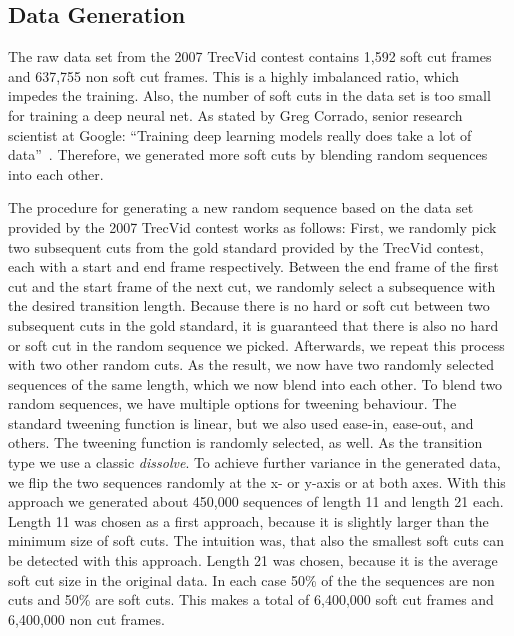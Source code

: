 \subsection{Data Generation}
\label{sec:soft_cut_data_generation}

The raw data set from the 2007 TrecVid contest contains 1,592 soft cut frames and 637,755 non soft cut frames.
This is a highly imbalanced ratio, which impedes the training.
Also, the number of soft cuts in the data set is too small for training a deep neural net.
As stated by Greg Corrado, senior research scientist at Google: ``Training deep learning models really does take a lot of data''~\cite{dataDeepNeuralNets}.
Therefore, we generated more soft cuts by blending random sequences into each other.

The procedure for generating a new random sequence based on the data set provided by the 2007 TrecVid contest works as follows:
First, we randomly pick two subsequent cuts from the gold standard provided by the TrecVid contest, each with a start and end frame respectively.
Between the end frame of the first cut and the start frame of the next cut, we randomly select a subsequence with the desired transition length.
Because there is no hard or soft cut between two subsequent cuts in the gold standard, it is guaranteed that there is also no hard or soft cut in the random sequence we picked.
Afterwards, we repeat this process with two other random cuts.
As the result, we now have two randomly selected sequences of the same length, which we now blend into each other.
To blend two random sequences, we have multiple options for tweening behaviour.
The standard tweening function is linear, but we also used ease-in, ease-out, and others.
The tweening function is randomly selected, as well.
As the transition type we use a classic \textit{dissolve}.
To achieve further variance in the generated data, we flip the two sequences randomly at the x- or y-axis or at both axes.
With this approach we generated about 450,000 sequences of length 11 and length 21 each.
Length 11 was chosen as a first approach, because it is slightly larger than the minimum size of soft cuts.
The intuition was, that also the smallest soft cuts can be detected with this approach.
Length 21 was chosen, because it is the average soft cut size in the original data.
In each case 50\% of the the sequences are non cuts and 50\% are soft cuts.
This makes a total of 6,400,000 soft cut frames and 6,400,000 non cut frames.
